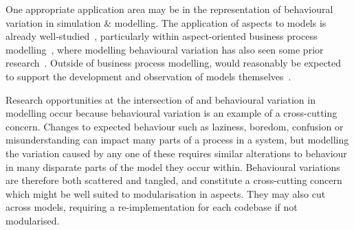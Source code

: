One appropriate application area may be in the representation of behavioural
variation in simulation \& modelling. The application of aspects to models is
already well-studied~\cite{DEVSaspectorientation2008aksu,chibani2013toward},
particularly within aspect-oriented business process
modelling~\cite{charfi2007ao4bpel,Cappelli_AOBPM,jalali2012aspect}, where
modelling behavioural variation has also seen some prior
research~\cite{Machado_2011,stocker2013secsy,pourmasoumi2015business,ExecutableBPMNMitsyuk}. 
Outside of business process modelling, \aspectorientation{} would reasonably be
expected to support the development and observation of models
themselves~\cite{gulyas1999use}. 

Research opportunities at the intersection of \aspectorientation{} and
behavioural variation in modelling occur because behavioural variation is an
example of a cross-cutting concern. Changes to expected behaviour such as
laziness, boredom, confusion or misunderstanding can impact many parts of a
process in a \sociotechnical system, but modelling the variation caused by any
one of these requires similar alterations to behaviour in many disparate parts
of the model they occur within. Behavioural variations are therefore both
scattered and tangled, and constitute a cross-cutting concern which might be
well suited to modularisation in aspects. They may also cut across models,
requiring a re-implementation for each codebase if not modularised.

